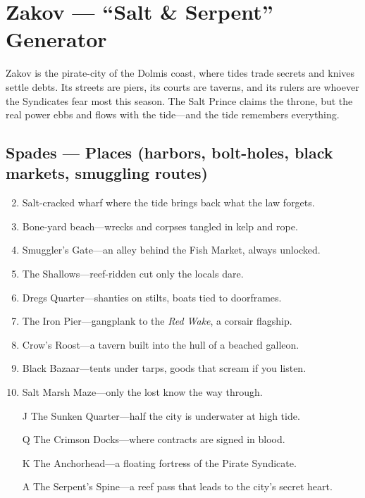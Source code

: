 \section{Zakov --- ``Salt \& Serpent'' Generator}
\label{chap:zakov}

\noindent
Zakov is the pirate-city of the Dolmis coast, where tides trade secrets and knives settle debts. Its streets are piers, its courts are taverns, and its rulers are whoever the Syndicates fear most this season. The Salt Prince claims the throne, but the real power ebbs and flows with the tide---and the tide remembers everything.

\subsection*{Spades --- Places (harbors, bolt-holes, black markets, smuggling routes)}
\begin{enumerate}
\setcounter{enumi}{1}
\item Salt-cracked wharf where the tide brings back what the law forgets.
\item Bone-yard beach---wrecks and corpses tangled in kelp and rope.
\item Smuggler's Gate---an alley behind the Fish Market, always unlocked.
\item The Shallows---reef-ridden cut only the locals dare.
\item Dregs Quarter---shanties on stilts, boats tied to doorframes.
\item The Iron Pier---gangplank to the \textit{Red Wake}, a corsair flagship.
\item Crow's Roost---a tavern built into the hull of a beached galleon.
\item Black Bazaar---tents under tarps, goods that scream if you listen.
\item Salt Marsh Maze---only the lost know the way through.
\item[J] The Sunken Quarter---half the city is underwater at high tide.
\item[Q] The Crimson Docks---where contracts are signed in blood.
\item[K] The Anchorhead---a floating fortress of the Pirate Syndicate.
\item[A] The Serpent's Spine---a reef pass that leads to the city's secret heart.
\end{enumerate}

